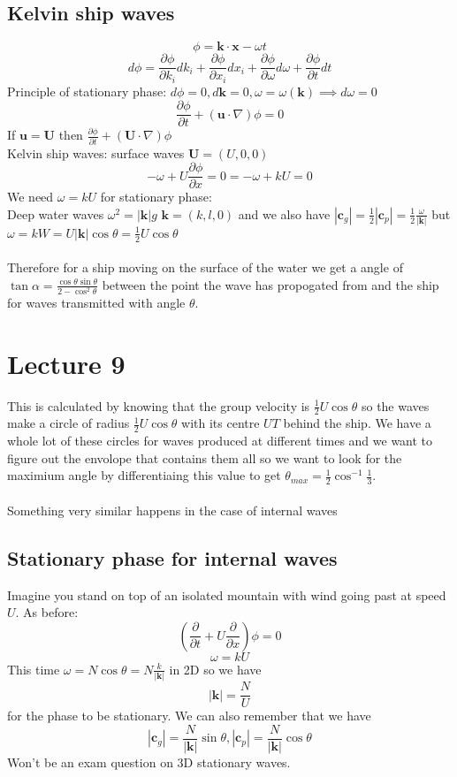 \documentclass{article}
\begin{document}
\subsection{Kelvin ship waves}
$$
\phi = \bm k \cdot \bm x - \omega t
$$
$$
d \phi = \frac{\partial \phi}{\partial k_i} dk_i + \frac{\partial \phi}{\partial x_i} dx_i + \frac{\partial \phi}{\partial \omega} d\omega + \frac{\partial \phi}{\partial t} dt
$$
Principle of stationary phase: $d\phi = 0, d\bm k =0, \omega = \omega(\bm k) \implies d \omega = 0$
$$
\frac{\partial \phi}{\partial t} + (\bm u \cdot \nabla) \phi = 0
$$
If $\bm u = \bm U$ then $\frac{\partial \phi}{\partial t} + ( \bm U \cdot \nabla ) \phi$\\
Kelvin ship waves: surface waves $\bm U = (U,0,0)$
$$
- \omega + U \frac{\partial \phi}{\partial x} = 0 = - \omega + k U = 0
$$
We need $\omega = k U$ for stationary phase:\\
Deep water waves $\omega^2 = |\bm k| g$ $\bm k = (k,l,0)$ and we also have $|\bm c_g| = \frac{1}{2} |\bm c_p| = \frac{1}{2} \frac{\omega}{|\bm k|}$ but $\omega = k W = U |\bm k | \cos \theta = \frac{1}{2} U \cos \theta$\\\\
Therefore for a ship moving on the surface of the water we get a angle of $\tan \alpha = \frac{\cos \theta \sin \theta}{2 - \cos^2 \theta}$ between the point the wave has propogated from and the ship for waves transmitted with angle $\theta$.
\section{Lecture 9}
This is calculated by knowing that the group velocity is $\frac{1}{2} U \cos \theta$ so the waves make a circle of radius $\frac{1}{2} U \cos \theta$ with its centre $UT$ behind the ship. We have a whole lot of these circles for waves produced at different times and we want to figure out the envolope that contains them all so we want to look for the maximium angle by differentiaing this value to get $\theta_{max} = \frac{1}{2} \cos^{-1} \frac{1}{3}$. \\\\
Something very similar happens in the case of internal waves
\subsection{Stationary phase for internal waves}
Imagine you stand on top of an isolated mountain with wind going past at speed $U$. As before:
$$
(\frac{\partial}{\partial t} + U \frac{\partial}{\partial x}) \phi = 0
$$
$$
\omega = k U
$$
This time $\omega = N \cos \theta = N\frac{k}{|\bm k|}$ in 2D so we have
$$
|\bm k| = \frac{N}{U}
$$
for the phase to be stationary. We can also remember that we have 
$$
|\bm c_g| = \frac{N}{|\bm k|} \sin \theta, |\bm c_p| = \frac{N}{|\bm k|} \cos \theta
$$
Won't be an exam question on 3D stationary waves.
\end{document}
